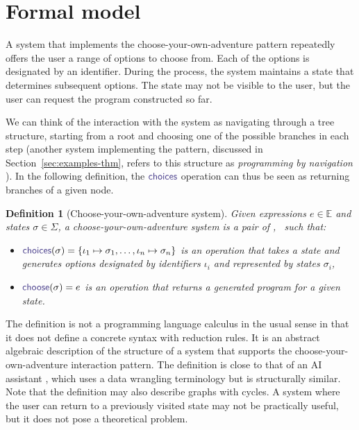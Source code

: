 \documentclass[nonacm,anonymous,sigplan,screen]{acmart}
\newcommand{\ident}[1]{\textsf{\color{DarkSlateBlue}{#1}}}
\newcommand{\select}{\textnormal{\ident{choose}}}
\newcommand{\choices}{\textnormal{\ident{choices}}}
\newtheorem{definition}{Definition}
\begin{document}
\section{Formal model}
\label{sec:calculus}

A system that implements the choose-your-own-adventure pattern repeatedly offers
the user a range of options to choose from. Each of the options is designated by an identifier.
During the process, the system maintains a state that determines subsequent options. The state
may not be visible to the user, but the user can request the program constructed
so far.

We can think of the interaction with the system as navigating through a tree structure, starting
from a root and choosing one of the possible branches in each step
(another system implementing the pattern, discussed in Section~\ref{sec:examples-thm}, refers to
this structure as \emph{programming by navigation} \cite{lubin-2025-pbn}).
In the following definition, the $\choices$ operation can thus be seen as returning
branches of a given node.

\begin{definition}[Choose-your-own-adventure system]\label{def:calculus}
Given expressions $e\in \mathbb{E}$ and states $\sigma \in \Sigma$, a choose-your-own-adventure
system is a pair of \choices, \select\ such that:

\begin{itemize}
  \item $\choices(\sigma) = \{\iota_1\mapsto\sigma_1, \ldots, \iota_n\mapsto\sigma_n\}$ is
    an operation that takes a state and generates options designated by identifiers $\iota_i$
    and represented by states $\sigma_i$,
  \item $\select(\sigma) = e$ is an operation that returns a generated program for a given state.
\end{itemize}
\end{definition}

The definition is not a programming language calculus in the usual sense in that it does not
define a concrete syntax with reduction rules. It is an abstract algebraic description of
the structure of a system that supports the choose-your-own-adventure interaction pattern.
The definition is close to that of an AI assistant \cite{petricek-2023-aias}, which uses a
data wrangling terminology but is structurally similar.
Note that the definition may also describe graphs with cycles.
A system where the user can return to a previously
visited state may not be practically useful, but it does not pose a theoretical problem.
\end{document}
